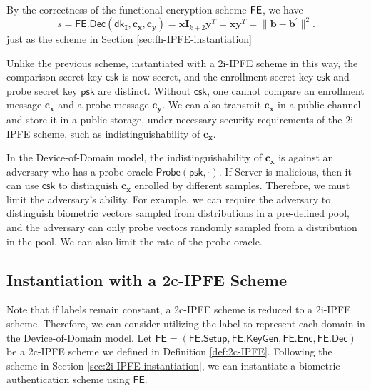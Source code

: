 By the correctness of the functional encryption scheme $\sf FE$, we have
\[
	s = \textsf{FE.Dec}(\textsf{dk}_{\mathbf{I}}, \mathbf{c_x}, \mathbf{c_y}) =  \mathbf{x} \mathbf{I}_{k+2} \mathbf{y}^T = \mathbf{x} \mathbf{y}^T = \| \mathbf{b} - \mathbf{b}^\prime \|^2.
\]
just as the scheme in Section \ref{sec:fh-IPFE-instantiation}


Unlike the previous scheme, instantiated with a 2i-IPFE scheme in this way, the comparison secret key $\textsf{csk}$ is now secret, and the enrollment secret key $\textsf{esk}$ and probe secret key $\textsf{psk}$ are distinct. Without $\textsf{csk}$, one cannot compare an enrollment message $\mathbf{c_x}$ and a probe message $\mathbf{c_y}$. We can also transmit $\mathbf{c_x}$ in a public channel and store it in a public storage, under necessary security requirements of the 2i-IPFE scheme, such as indistinguishability of $\mathbf{c_x}$.

In the Device-of-Domain model, the indistinguishability of $\mathbf{c_x}$ is against an adversary who has a probe oracle $\textsf{Probe}(\textsf{psk}, \cdot)$. If \textsf{Server} is malicious, then it can use $\textsf{csk}$ to distinguish $\mathbf{c_x}$ enrolled by different samples. Therefore, we must limit the adversary's ability. For example, we can require the adversary to distinguish biometric vectors sampled from distributions in a pre-defined pool, and the adversary can only probe vectors randomly sampled from a distribution in the pool. We can also limit the rate of the probe oracle.


\subsection{Instantiation with a 2c-IPFE Scheme}
\label{sec:2c-IPFE-instantiation}

Note that if labels remain constant, a 2c-IPFE scheme is reduced to a 2i-IPFE scheme. Therefore, we can consider utilizing the label to represent each domain in the Device-of-Domain model. Let $\textsf{FE} = (\textsf{FE.Setup}, \textsf{FE.KeyGen}, \textsf{FE.Enc}, \textsf{FE.Dec})$ be a 2c-IPFE scheme we defined in Definition \ref{def:2c-IPFE}. Following the scheme in Section \ref{sec:2i-IPFE-instantiation}, we can instantiate a biometric authentication scheme using $\textsf{FE}$.

